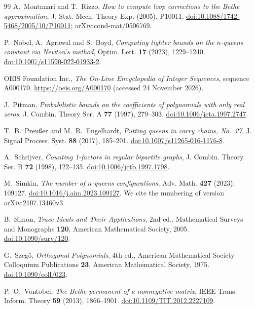 \begin{thebibliography}{99}
 A.~Montanari and T.~Rizzo, \emph{How to compute loop corrections to the
Bethe approximation}, J. Stat. Mech. Theory Exp. (2005), P10011.
\href{https://doi.org/10.1088/1742-5468/2005/10/P10011}{doi:10.1088/1742-5468/2005/10/P10011};
arXiv:cond-mat/0506769.

 P.~Nobel, A.~Agrawal and S.~Boyd, \emph{Computing tighter bounds on the $n$-queens
constant via Newton's method}, Optim. Lett. \textbf{17} (2023), 1229--1240.
\href{https://doi.org/10.1007/s11590-022-01933-2}{doi:10.1007/s11590-022-01933-2}.

 OEIS Foundation Inc., \emph{The On-Line Encyclopedia of Integer Sequences},
sequence A000170. \url{https://oeis.org/A000170} (accessed 24 November 2026).

 J.~Pitman, \emph{Probabilistic bounds on the coefficients of polynomials with only
real zeros}, J. Combin. Theory Ser. A \textbf{77} (1997), 279--303.
\href{https://doi.org/10.1006/jcta.1997.2747}{doi:10.1006/jcta.1997.2747}.

 T.~B.~Preußer and M.~R.~Engelhardt, \emph{Putting queens in carry chains, No.~27}, J. Signal
Process. Syst. \textbf{88} (2017), 185--201.
\href{https://doi.org/10.1007/s11265-016-1176-8}{doi:10.1007/s11265-016-1176-8}.

 A.~Schrijver, \emph{Counting 1-factors in regular bipartite graphs},
J. Combin. Theory Ser. B \textbf{72} (1998), 122--135.
\href{https://doi.org/10.1006/jctb.1997.1798}{doi:10.1006/jctb.1997.1798}.

 M.~Simkin, \emph{The number of $n$-queens configurations}, Adv. Math.
\textbf{427} (2023), 109127.
\href{https://doi.org/10.1016/j.aim.2023.109127}{doi:10.1016/j.aim.2023.109127}. We cite the numbering of
version arXiv:2107.13460v3.

 B.~Simon, \emph{Trace Ideals and Their Applications}, 2nd ed., Mathematical Surveys
and Monographs \textbf{120}, American Mathematical Society, 2005.
\href{https://doi.org/10.1090/surv/120}{doi:10.1090/surv/120}.

 G.~Szegő, \emph{Orthogonal Polynomials}, 4th ed., American Mathematical Society Colloquium
Publications \textbf{23}, American Mathematical Society, 1975.
\href{https://doi.org/10.1090/coll/023}{doi:10.1090/coll/023}.

 P.~O.~Vontobel, \emph{The Bethe permanent of a nonnegative matrix}, IEEE Trans.
Inform. Theory \textbf{59} (2013), 1866--1901.
\href{https://doi.org/10.1109/TIT.2012.2227109}{doi:10.1109/TIT.2012.2227109}.


\end{thebibliography}
